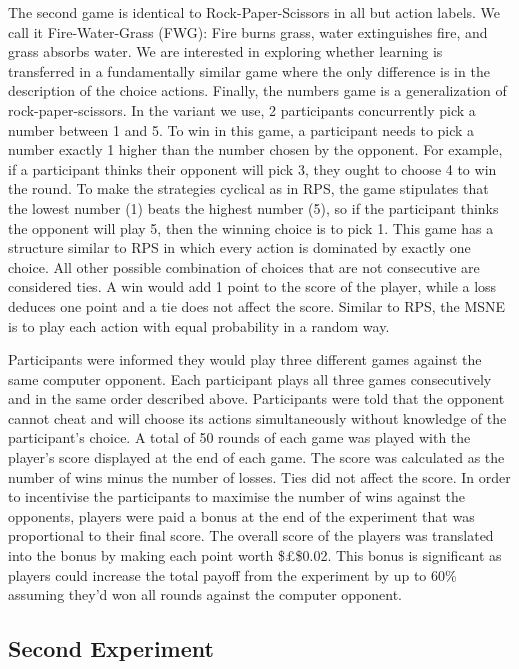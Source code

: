 \documentclass[,man,floatsintext]{apa6}
\begin{document}
The second game is identical to Rock-Paper-Scissors in all but action labels. We call it Fire-Water-Grass (FWG): Fire burns grass, water extinguishes fire, and grass absorbs water. We are interested in exploring whether learning is transferred in a fundamentally similar game where the only difference is in the description of the choice actions. Finally, the numbers game is a generalization of rock-paper-scissors. In the variant we use, 2 participants concurrently pick a number between 1 and 5. To win in this game, a participant needs to pick a number exactly 1 higher than the number chosen by the opponent. For example, if a participant thinks their opponent will pick 3, they ought to choose 4 to win the round. To make the strategies cyclical as in RPS, the game stipulates that the lowest number (1) beats the highest number (5), so if the participant thinks the opponent will play 5, then the winning choice is to pick 1. This game has a structure similar to RPS in which every action is dominated by exactly one choice. All other possible combination of choices that are not consecutive are considered ties. A win would add 1 point to the score of the player, while a loss deduces one point and a tie does not affect the score. Similar to RPS, the MSNE is to play each action with equal probability in a random way.

Participants were informed they would play three different games against the same computer opponent. Each participant plays all three games consecutively and in the same order described above. Participants were told that the opponent cannot cheat and will choose its actions simultaneously without knowledge of the participant's choice. A total of 50 rounds of each game was played with the player's score displayed at the end of each game. The score was calculated as the number of wins minus the number of losses. Ties did not affect the score. In order to incentivise the participants to maximise the number of wins against the opponents, players were paid a bonus at the end of the experiment that was proportional to their final score. The overall score of the players was translated into the bonus by making each point worth \$£\$0.02. This bonus is significant as players could increase the total payoff from the experiment by up to 60\% assuming they'd won all rounds against the computer opponent.

\hypertarget{second-experiment}{%
\subsection{Second Experiment}\label{second-experiment}}
\end{document}
